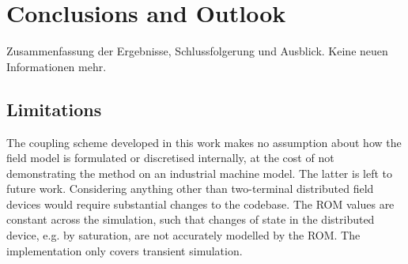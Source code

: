 
\chapter{Conclusions and Outlook}
\label{ch:conclusions}

Zusammenfassung der Ergebnisse, Schlussfolgerung und Ausblick. Keine neuen Informationen mehr.
\section{Limitations}
The coupling scheme developed in this work makes no assumption about how the field model is formulated or discretised internally, at the cost of not demonstrating the method on an industrial machine model. The latter is left to future work.
Considering anything other than two-terminal distributed field devices would require substantial changes to the codebase. The ROM values are constant across the simulation, such that changes of state in the distributed device, e.g. by saturation, are not accurately modelled by the ROM. The implementation only covers transient simulation. %